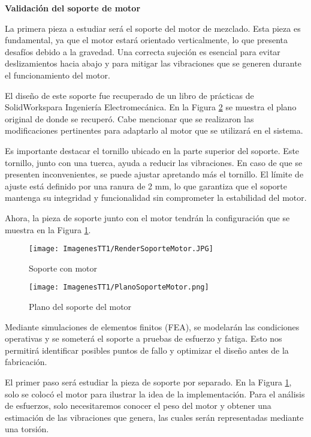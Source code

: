 \documentclass[14pt,oneside]{extarticle} %
\begin{document}
\textbf{Validación del soporte de motor}

La primera pieza a estudiar será el soporte del motor de mezclado. Esta pieza es fundamental, ya que el motor estará orientado verticalmente, lo que presenta desafíos debido a la gravedad. Una correcta sujeción es esencial para evitar deslizamientos hacia abajo y para mitigar las vibraciones que se generen durante el funcionamiento del motor.

El diseño de este soporte fue recuperado de un libro de prácticas de SolidWorks\textregistered para Ingeniería Electromecánica. En la Figura \ref{fig:PlanoSoporteMotor} se muestra el plano original de donde se recuperó. Cabe mencionar que se realizaron las modificaciones pertinentes para adaptarlo al motor que se utilizará en el sistema.

Es importante destacar el tornillo ubicado en la parte superior del soporte. Este tornillo, junto con una tuerca, ayuda a reducir las vibraciones. En caso de que se presenten inconvenientes, se puede ajustar apretando más el tornillo. El límite de ajuste está definido por una ranura de 2 mm, lo que garantiza que el soporte mantenga su integridad y funcionalidad sin comprometer la estabilidad del motor.

Ahora, la pieza de soporte junto con el motor tendrán la configuración que se muestra en la Figura \ref{fig:SoporteMotor}.

\begin{figure}[H]
    \centering
    \texttt{[image: ImagenesTT1/RenderSoporteMotor.JPG]}
    \caption{Soporte con motor}
    \label{fig:SoporteMotor}
\end{figure}

\begin{figure}[H]
    \centering
    \texttt{[image: ImagenesTT1/PlanoSoporteMotor.png]}
    \caption{Plano del soporte del motor \cite{solidworks_manual}}
    \label{fig:PlanoSoporteMotor}
\end{figure}

Mediante simulaciones de elementos finitos (FEA), se modelarán las condiciones operativas y se someterá el soporte a pruebas de esfuerzo y fatiga. Esto nos permitirá identificar posibles puntos de fallo y optimizar el diseño antes de la fabricación. 

El primer paso será estudiar la pieza de soporte por separado. En la Figura \ref{fig:SoporteMotor}, solo se colocó el motor para ilustrar la idea de la implementación. Para el análisis de esfuerzos, solo necesitaremos conocer el peso del motor y obtener una estimación de las vibraciones que genera, las cuales serán representadas mediante una torsión.
\end{document}

